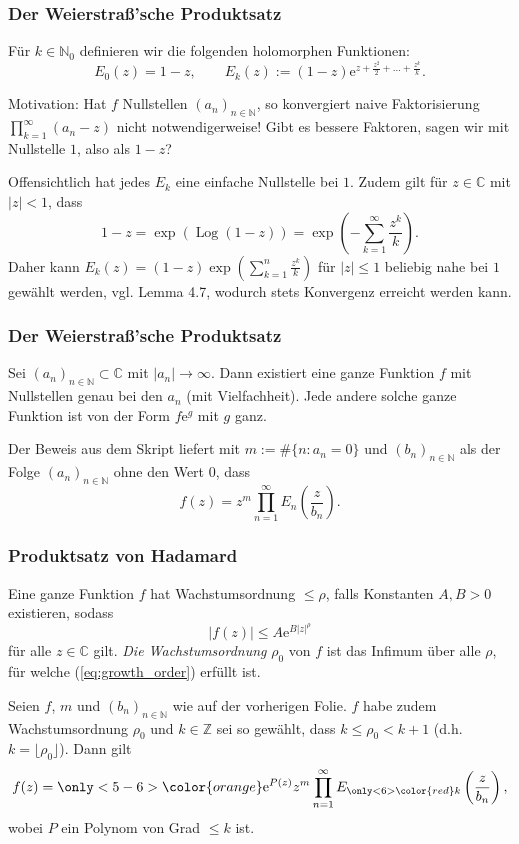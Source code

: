 \documentclass[10pt]{beamer}
\begin{document}
\begin{frame}
	\frametitle{Der Weierstraß'sche Produktsatz}
	\pause
	\begin{definition}
		Für $k \in \mathbb{N}_0$ definieren wir die folgenden holomorphen Funktionen:
		\[
			E_0(z) = 1 - z, \qquad E_k(z) := (1 - z) \mathrm{e}^{z + \frac{z^2}{2} + \dots + \frac{z^k}{k}}.
		\]
	\end{definition}
	\pause
	Motivation: Hat $f$ Nullstellen $(a_n)_{n \in \mathbb{N}}$, so konvergiert \glqq naive\grqq{} Faktorisierung $\prod_{k = 1}^{\infty} (a_n - z)$ nicht notwendigerweise!
	\pause
	Gibt es bessere Faktoren, sagen wir mit Nullstelle $1$, also als $1 - z$?
	\pause

	Offensichtlich hat jedes $E_k$ eine einfache Nullstelle bei $1$.
	\pause
	Zudem gilt für $z \in \mathbb{C}$ mit $\lvert z \rvert < 1$, dass
	\[
		1 - z = \exp(\operatorname{Log}(1 - z)) = \exp\left(- \sum_{k = 1}^{\infty} \frac{z^k}{k}\right).
	\]
	\pause
	Daher kann $E_k(z) = (1 - z) \exp\left(\sum_{k = 1}^{n} \frac{z^k}{k}\right)$ für $\lvert z \rvert \le 1$ beliebig nahe bei $1$ gewählt werden, vgl. Lemma 4.7, wodurch stets Konvergenz erreicht werden kann.
\end{frame}
\begin{frame}
	\frametitle{Der Weierstraß'sche Produktsatz}
	\pause
	\begin{theorem}[Weierstraß]
		Sei $(a_n)_{n \in \mathbb{N}} \subset \mathbb{C}$ mit $\lvert a_n \rvert \to \infty$.
		Dann existiert eine ganze Funktion $f$ mit Nullstellen genau bei den $a_n$ (mit Vielfachheit).
		Jede andere solche ganze Funktion  ist von der Form $f \mathrm{e}^g$ mit $g$ ganz.
	\end{theorem}
	\pause
	Der Beweis aus dem Skript liefert mit $m := \#\{n : a_n = 0\}$ und $(b_n)_{n \in \mathbb{N}}$ als der Folge $(a_n)_{n \in \mathbb{N}}$ ohne den Wert $0$, dass
	\[
		f(z) = z^m \prod_{n = 1}^{\infty} E_n\left(\frac{z}{b_n}\right).
	\]
\end{frame}
\begin{frame}
	\frametitle{Produktsatz von Hadamard}
	\pause
	\begin{definition}
		Eine ganze Funktion $f$ hat Wachstumsordnung $\le \rho$, falls Konstanten $A, B > 0$ existieren, sodass
		\begin{equation}\label{eq:growth_order}
			\lvert f(z) \rvert \le A \mathrm{e}^{B \lvert z \rvert^{\rho}}
		\end{equation}
		für alle $z \in \mathbb{C}$ gilt.
		\pause
		\emph{Die Wachstumsordnung} $\rho_0$ von $f$ ist das Infimum über alle $\rho$, für welche (\ref{eq:growth_order}) erfüllt ist.
	\end{definition}
	\pause
	\begin{theorem}[Hadamard]
		Seien $f$, $m$ und $(b_n)_{n \in \mathbb{N}}$ wie auf der vorherigen Folie.
		$f$ habe zudem Wachstumsordnung $\rho_0$ und $k \in \mathbb{Z}$ sei so gewählt, dass $k \le \rho_0 < k + 1$ (d.h. $k = \lfloor \rho_0 \rfloor$).
		Dann gilt
		\[
			f(z) = {\only<5-6>{\color{orange}}\mathrm{e}^{P(z)}} z^m \prod_{n = 1}^{\infty} E_{\only<6>{\color{red}}k} \left( \frac{z}{b_n} \right),
		\]
		wobei $P$ ein Polynom von Grad $\le k$ ist.
	\end{theorem}
\end{frame}
\end{document}
